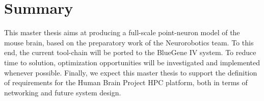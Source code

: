 \documentclass[a4paper]{article}
\begin{document}
  



\section{Summary}
This master thesis aims at producing a full-scale point-neuron model of the mouse
brain, based on the preparatory work of the Neurorobotics team. To this end, the
current tool-chain will be ported to the BlueGene IV system. To reduce time to
solution, optimization opportunities will be investigated and implemented whenever
possible.
Finally, we expect this master thesis to support the definition of requirements for the
Human Brain Project HPC platform, both in terms of networking and future system design.

%

%
\end{document}
